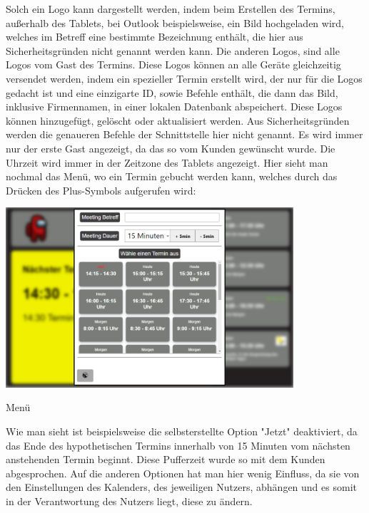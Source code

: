 Solch ein Logo kann dargestellt werden, indem beim Erstellen des Termins, außerhalb des Tablets, bei Outlook beispielsweise, ein Bild hochgeladen wird, welches im Betreff eine bestimmte Bezeichnung enthält, die hier aus Sicherheitsgründen nicht genannt werden kann.
\newline
Die anderen Logos, sind alle Logos vom Gast des Termins.
Diese Logos können an alle Geräte gleichzeitig versendet werden, indem ein spezieller Termin erstellt wird, der nur für die Logos gedacht ist und eine einzigarte ID, sowie Befehle enthält, die dann das Bild, inklusive Firmennamen, in einer lokalen Datenbank abspeichert.
Diese Logos können hinzugefügt, gelöscht oder aktualisiert werden.
Aus Sicherheitsgründen werden die genaueren Befehle der Schnittstelle hier nicht genannt.
\newline
Es wird immer nur der erste Gast angezeigt, da das so vom Kunden gewünscht wurde.
\newline
Die Uhrzeit wird immer in der Zeitzone des Tablets angezeigt.
\newline
\newline
Hier sieht man nochmal das Menü, wo ein Termin gebucht werden kann, welches durch das Drücken des Plus-Symbols aufgerufen wird:
\par\vspace{1cm}
    \centering
    \includegraphics[width=0.8\textwidth]{Bilder/Ergebnis_TerminErstellen_Menue}
    \caption{Menü}
    \label{fig:Menü}
\par\vspace{1cm}
\raggedright
Wie man sieht ist beispielsweise die selbsterstellte Option "Jetzt" deaktiviert, da das Ende des hypothetischen Termins innerhalb von 15 Minuten vom nächsten anstehenden Termin beginnt.
Diese Pufferzeit wurde so mit dem Kunden abgesprochen.
Auf die anderen Optionen hat man hier wenig Einfluss, da sie von den Einstellungen des Kalenders, des jeweiligen Nutzers, abhängen und es somit in der Verantwortung des Nutzers liegt, diese zu ändern.
